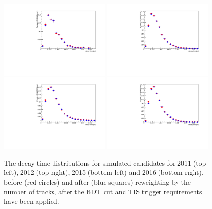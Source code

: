 \begin{figure}[ht]
  \centering
    \includegraphics[width=0.49\textwidth]{Figs/LifetimeMeasurement/2011_B_TAU_Bd2KPi_MC_weighted_and_unweighted.pdf}
    \includegraphics[width=0.49\textwidth]{Figs/LifetimeMeasurement/2012_B_TAU_Bd2KPi_MC_weighted_and_unweighted.pdf}
    \includegraphics[width=0.49\textwidth]{Figs/LifetimeMeasurement/2015_B_TAU_Bd2KPi_MC_weighted_and_unweighted.pdf}
    \includegraphics[width=0.49\textwidth]{Figs/LifetimeMeasurement/2016_B_TAU_Bd2KPi_MC_weighted_and_unweighted.pdf}
  \caption{The decay time distributions for \bdkpi simulated candidates for 2011 (top left), 2012 (top right), 2015 (bottom left) and 2016 (bottom right), before (red circles) and after (blue squares) reweighting by the number of tracks, after the BDT cut and TIS trigger requirements have been applied.}
  \label{fig:BdToKpi_weightDecayTime}
\end{figure}



